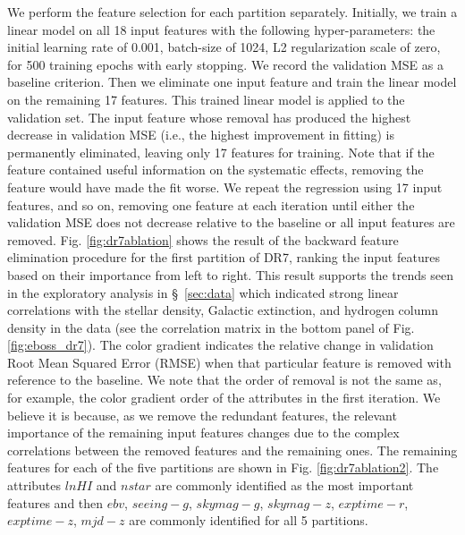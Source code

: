 We perform the feature selection for each partition separately. Initially, we train a linear model on all 18 input features with the following hyper-parameters: the initial learning rate of 0.001, batch-size of 1024, L2 regularization scale of zero, for 500 training epochs with early stopping. We record the validation MSE as a baseline criterion. Then we eliminate one input feature and train the linear model on the remaining 17 features. This trained linear model is applied to the validation set. The input feature whose removal has produced the highest decrease in validation MSE (i.e., the highest improvement in fitting) is permanently eliminated, leaving only 17 features for training. Note that if the feature contained useful information on the systematic effects, removing the feature would have made the fit worse. We repeat the regression using 17 input features, and so on, removing one feature at each iteration until either the validation MSE does not decrease relative to the baseline or all input features are removed. Fig. \ref{fig:dr7ablation} shows the result of the backward feature elimination procedure for the first partition of DR7, ranking the input features based on their importance from left to right. This result supports the trends seen in the exploratory analysis in \S~\ref{sec:data} which indicated strong linear correlations with the stellar density, Galactic extinction, and hydrogen column density in the data (see the correlation matrix in the bottom panel of Fig. \ref{fig:eboss_dr7}). The color gradient indicates the relative change in validation Root Mean Squared Error (RMSE) when that particular feature is removed with reference to the baseline. We note that the order of removal is not the same as, for example, the color gradient order of the attributes in the first iteration. We believe it is because, as we remove the redundant features, the relevant importance of the remaining input features changes due to the complex correlations between the removed features and the remaining ones. The remaining features for each of the five partitions are shown in Fig. \ref{fig:dr7ablation2}. The attributes $lnHI$ and $nstar$ are commonly identified as the most important features and then $ebv$, $seeing-g$, $skymag-g$, $skymag-z$, $exptime-r$, $exptime-z$, $mjd-z$ are commonly identified for all 5 partitions.\\

